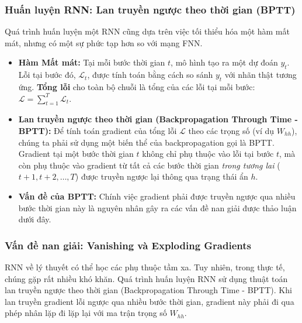 \subsubsection{Huấn luyện RNN: Lan truyền ngược theo thời gian (BPTT)}
\label{sssec:bptt}
Quá trình huấn luyện một RNN cũng dựa trên việc tối thiểu hóa một hàm mất mát, nhưng có một sự phức tạp hơn so với mạng FNN.
\begin{itemize}
    \item \textbf{Hàm Mất mát:} Tại mỗi bước thời gian $t$, mô hình tạo ra một dự đoán $y_t$. Lỗi tại bước đó, $\mathcal{L}_t$, được tính toán bằng cách so sánh $y_t$ với nhãn thật tương ứng. \textbf{Tổng lỗi} cho toàn bộ chuỗi là tổng của các lỗi tại mỗi bước: $\mathcal{L} = \sum_{t=1}^{T} \mathcal{L}_t$.
    
    \item \textbf{Lan truyền ngược theo thời gian (Backpropagation Through Time - BPTT):} Để tính toán gradient của tổng lỗi $\mathcal{L}$ theo các trọng số (ví dụ $W_{hh}$), chúng ta phải sử dụng một biến thể của backpropagation gọi là BPTT. Gradient tại một bước thời gian $t$ không chỉ phụ thuộc vào lỗi tại bước $t$, mà còn phụ thuộc vào gradient từ tất cả các bước thời gian \textit{trong tương lai} ($t+1, t+2, \dots, T$) được truyền ngược lại thông qua trạng thái ẩn $h$.
    
    \item \textbf{Vấn đề của BPTT:} Chính việc gradient phải được truyền ngược qua nhiều bước thời gian này là nguyên nhân gây ra các vấn đề nan giải được thảo luận dưới đây.
\end{itemize}

\subsubsection{Vấn đề nan giải: Vanishing và Exploding Gradients}
RNN về lý thuyết có thể học các phụ thuộc tầm xa. Tuy nhiên, trong thực tế, chúng gặp rất nhiều khó khăn. Quá trình huấn luyện RNN sử dụng thuật toán lan truyền ngược theo thời gian (Backpropagation Through Time - BPTT). Khi lan truyền gradient lỗi ngược qua nhiều bước thời gian, gradient này phải đi qua phép nhân lặp đi lặp lại với ma trận trọng số $W_{hh}$.


